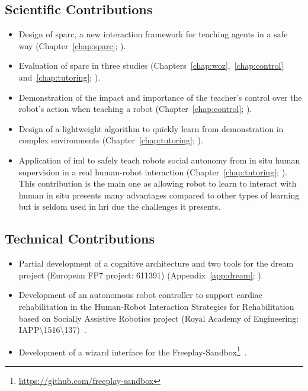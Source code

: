 \subsection{Scientific Contributions}
\begin{itemize}
	\item Design of \gls{sparc}, a new interaction framework for teaching agents in a safe way (Chapter~\ref{chap:sparc}; \citealt{senft2015human,senft2015sparc}).
	\item Evaluation of \gls{sparc} in three studies (Chapters~\ref{chap:woz},~\ref{chap:control} and~\ref{chap:tutoring}; \citealt{senft2015sparc,senft2017supervised,senft2018robots}).
	\item Demonstration of the impact and importance of the teacher's control over the robot's action when teaching a robot (Chapter~\ref{chap:control}; \citealt{senft2016sparc,senft2017supervised}).
	\item Design of a lightweight algorithm to quickly learn from demonstration in complex environments (Chapter~\ref{chap:tutoring}; \citealt{senft2017toward}).
	\item Application of \gls{iml} to safely teach robots social autonomy from in situ human supervision in a real human-robot interaction (Chapter~\ref{chap:tutoring}; \citealt{senft2018robots}). This contribution is the main one as allowing robot to learn to interact with human in situ presents many advantages compared to other types of learning but is seldom used in \gls{hri} due the challenges it presents.
\end{itemize}

\subsection{Technical Contributions}
\begin{itemize}
	\item Partial development of a cognitive architecture and two tools for the \acrshort{dream} project (European FP7 project: 611391) (Appendix~\ref{app:dream}; \citealt{esteban2017build}).
	\item Development of an autonomous robot controller to support cardiac rehabilitation in the Human-Robot Interaction Strategies for Rehabilitation based on Socially Assistive Robotics project (Royal Academy of Engineering: IAPP\textbackslash1516\textbackslash137)~\citep{lara2017human,casas2018social}.
	\item Development of a wizard interface for the Freeplay-Sandbox\footnote{\url{https://github.com/freeplay-sandbox}}~\citep{lemaignan2017free}.
\end{itemize}
	

